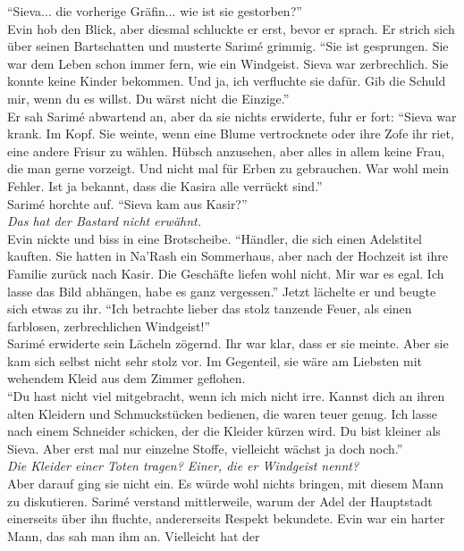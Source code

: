 ``Sieva... die vorherige Gräfin... wie ist sie gestorben?''\\
Evin hob den Blick, aber diesmal schluckte er erst, bevor er sprach. Er strich sich über seinen 
Bartschatten und musterte Sarimé grimmig. ``Sie ist gesprungen. Sie war dem Leben schon immer fern, 
wie ein Windgeist. Sieva war zerbrechlich. Sie konnte keine Kinder bekommen. Und ja, ich verfluchte 
sie dafür. Gib die Schuld mir, wenn du es willst. Du wärst nicht die Einzige.''\\
Er sah Sarimé abwartend an, aber da sie nichts erwiderte, fuhr er fort: ``Sieva war krank. Im 
Kopf. Sie weinte, wenn eine Blume vertrocknete oder ihre Zofe ihr riet, eine andere Frisur zu 
wählen. Hübsch anzusehen, aber alles in allem keine Frau, die man gerne vorzeigt. Und nicht mal für 
Erben zu gebrauchen. War wohl mein Fehler. Ist ja bekannt, dass die Kasira alle verrückt sind.''\\
Sarimé horchte auf. ``Sieva kam aus Kasir?''\\
\textit{Das hat der Bastard nicht erwähnt.}\\
Evin nickte und biss in eine Brotscheibe. ``Händler, die sich einen Adelstitel kauften. Sie hatten 
in Na'Rash ein Sommerhaus, aber nach der Hochzeit ist ihre Familie zurück nach Kasir. Die Geschäfte 
liefen wohl nicht. Mir war es egal. Ich lasse das Bild abhängen, habe es ganz vergessen.'' Jetzt 
lächelte er und beugte sich etwas zu ihr. ``Ich betrachte lieber das stolz tanzende Feuer, als 
einen farblosen, zerbrechlichen Windgeist!''\\
Sarimé erwiderte sein Lächeln zögernd. Ihr war klar, dass er sie meinte. Aber sie kam sich selbst 
nicht sehr stolz vor. Im Gegenteil, sie wäre am Liebsten mit wehendem Kleid aus dem Zimmer 
geflohen. \\
``Du hast nicht viel mitgebracht, wenn ich mich nicht irre. Kannst dich an ihren alten Kleidern und 
Schmuckstücken bedienen, die waren teuer genug. Ich lasse nach einem Schneider schicken, der die 
Kleider kürzen wird. Du bist kleiner als Sieva. Aber erst mal nur einzelne Stoffe, vielleicht 
wächst ja doch noch.''\\
\textit{Die Kleider einer Toten tragen? Einer, die er Windgeist nennt?}\\
Aber darauf ging sie nicht ein. Es würde wohl nichts bringen, mit diesem Mann zu diskutieren. 
Sarimé verstand mittlerweile, warum der Adel der Hauptstadt einerseits über ihn fluchte, 
andererseits Respekt bekundete. Evin war ein harter Mann, das sah man ihm an. Vielleicht hat der 

